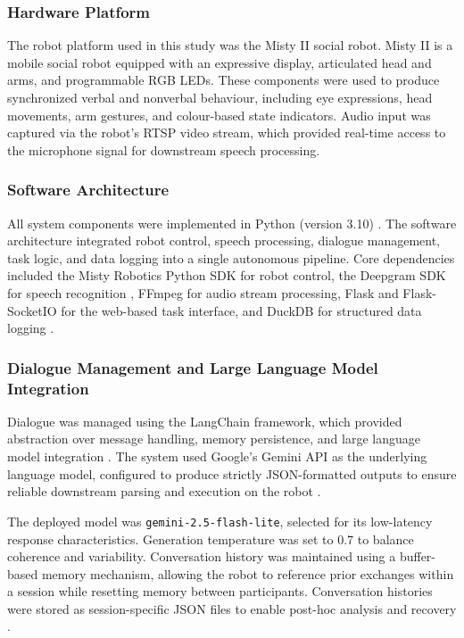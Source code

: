 \documentclass[
]{article}
\begin{document}
\subsubsection{Hardware Platform}\label{hardware-platform}

The robot platform used in this study was the Misty II social robot.
Misty II is a mobile social robot equipped with an expressive display,
articulated head and arms, and programmable RGB LEDs. These components
were used to produce synchronized verbal and nonverbal behaviour,
including eye expressions, head movements, arm gestures, and
colour-based state indicators. Audio input was captured via the robot's
RTSP video stream, which provided real-time access to the microphone
signal for downstream speech processing.

\subsubsection{Software Architecture}\label{software-architecture}

All system components were implemented in Python (version 3.10)
\autocite{python}. The software architecture integrated robot control,
speech processing, dialogue management, task logic, and data logging
into a single autonomous pipeline. Core dependencies included the Misty
Robotics Python SDK for robot control, the Deepgram SDK for speech
recognition \autocite{mistyrobotics,deepgram}, FFmpeg for audio stream
processing, Flask and Flask-SocketIO for the web-based task interface,
and DuckDB for structured data logging \autocite{duckdb2026}.

\subsubsection{Dialogue Management and Large Language Model
Integration}\label{dialogue-management-and-large-language-model-integration}

Dialogue was managed using the LangChain framework, which provided
abstraction over message handling, memory persistence, and large
language model integration \autocite{Chase_LangChain_2022}. The system
used Google's Gemini API as the underlying language model, configured to
produce strictly JSON-formatted outputs to ensure reliable downstream
parsing and execution on the robot \autocite{gemini}.

The deployed model was \texttt{gemini-2.5-flash-lite}, selected for its
low-latency response characteristics. Generation temperature was set to
0.7 to balance coherence and variability. Conversation history was
maintained using a buffer-based memory mechanism, allowing the robot to
reference prior exchanges within a session while resetting memory
between participants. Conversation histories were stored as
session-specific JSON files to enable post-hoc analysis and recovery
\autocite{gemini}.
\end{document}
